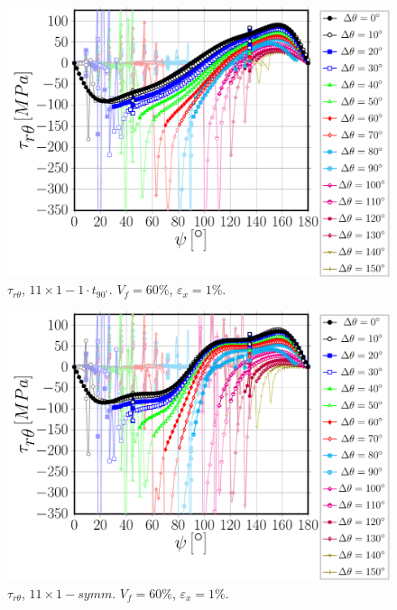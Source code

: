 \documentclass[review]{elsarticle}
\begin{document}
\begin{figure}[!h]
\centering
\includegraphics[width=\textwidth]{S5A0T1-circum-taurt.pdf}
\caption{$\tau_{r\theta}$, $11\times 1-1\cdot t_{90^{\circ}}$. $V_{f}=60\%$, $\varepsilon_{x}=1\%$.}\label{}
\end{figure}

\begin{figure}[!h]
\centering
\includegraphics[width=\textwidth]{S5A0vk-circum-taurt.pdf}
\caption{$\tau_{r\theta}$, $11\times 1-symm$. $V_{f}=60\%$, $\varepsilon_{x}=1\%$.}\label{}
\end{figure}
\end{document}
